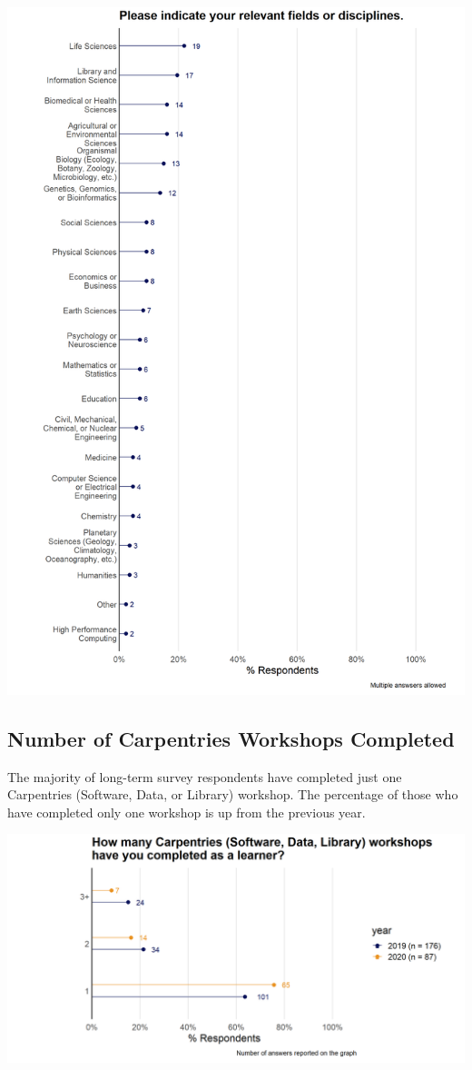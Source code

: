 \documentclass[
]{article}
\makeatletter
\def\maxwidth{\ifdim\Gin@nat@width>\linewidth\linewidth\else\Gin@nat@width\fi}
\makeatother
\begin{document}
\includegraphics[width=\maxwidth]{../figures/2020-12-longterm-domain-1}

\hypertarget{number-of-carpentries-workshops-completed}{%
\subsection{Number of Carpentries Workshops
Completed}\label{number-of-carpentries-workshops-completed}}

The majority of long-term survey respondents have completed just one
Carpentries (Software, Data, or Library) workshop. The percentage of
those who have completed only one workshop is up from the previous year.

\includegraphics[width=\maxwidth]{../figures/2020-12-longterm-workshop_attended_amount-1}
\end{document}
